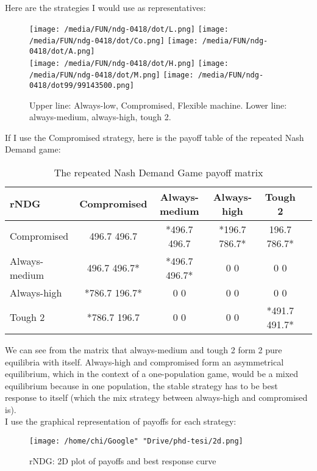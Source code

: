 \documentclass[12.5pt]{report}
\begin{document}
Here are the strategies I would use as representatives:

\begin{figure}
\center
\texttt{[image: /media/FUN/ndg-0418/dot/L.png]}
\texttt{[image: /media/FUN/ndg-0418/dot/Co.png]}
\texttt{[image: /media/FUN/ndg-0418/dot/A.png]}\\
\texttt{[image: /media/FUN/ndg-0418/dot/H.png]}
\texttt{[image: /media/FUN/ndg-0418/dot/M.png]}
\texttt{[image: /media/FUN/ndg-0418/dot99/99143500.png]}
\caption{Upper line: Always-low, Compromised, Flexible machine. Lower line: always-medium, always-high, tough 2.}
\end{figure}

If I use the Compromised strategy, here is the payoff table of the repeated Nash Demand game:

\begin{table}
\center
\begin{tabular}{l|ccccc}
\textbf{rNDG}&Compromised& Always-medium & Always-high & Tough 2\\
\hline
Compromised & 496.7 496.7 &  *496.7 496.7 &  *196.7 786.7* &  196.7 786.7* \\
Always-medium &  496.7 496.7* & *496.7 496.7*  &     0 0    &        0 0   \\
Always-high &  *786.7 196.7*   &    0 0     &       0 0     &       0 0      \\
Tough 2 & *786.7 196.7  &      0 0     &       0 0    &   *491.7 491.7*\\
\end{tabular}
\caption{The repeated Nash Demand Game payoff matrix}
\end{table}

We can see from the matrix that always-medium and tough 2 form 2 pure equilibria with itself. Always-high and compromised form an asymmetrical equilibrium, which in the context of a one-population game, would be a mixed equilibrium because in one population, the stable strategy has to be best response to itself (which the mix strategy between always-high and compromised is).\\

I use the graphical representation of payoffs for each strategy:

\begin{figure}[h!]
\texttt{[image: /home/chi/Google" "Drive/phd-tesi/2d.png]}
\caption{rNDG: 2D plot of payoffs and best response curve}
\end{figure}
\end{document}
